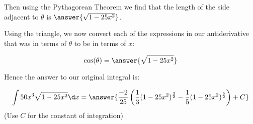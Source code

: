 \documentclass{ximera}
\begin{document}
\begin{exercise}
\begin{exercise}
\begin{exercise}
Then using the Pythagorean Theorem we find that the
 length of the side adjacent to $\theta$ is $\answer{\sqrt{1-25x^{2}}}$. 

Using the triangle, we now convert each of the expressions in our antiderivative that was in terms of $\theta$ to be in terms of $x$:

\[
\cos(\theta)=\answer{\sqrt{1-25x^{2}}}
\]

\begin{exercise}
Hence the answer to our original integral is: 

\[
\int 50 x^{3} \sqrt{1-25x^{2}}  \d x= \answer{ \frac{-2}{25} \left( \frac{1}{3}(1-25x^{2})^{\frac{3}{2}} - \frac{1}{5}(1-25x^{2})^{\frac{5}{2}}\right) + C }
\]
(Use $C$ for the constant of integration)





\end{exercise}
\end{exercise}

\end{exercise}

\end{exercise}
\end{document}
